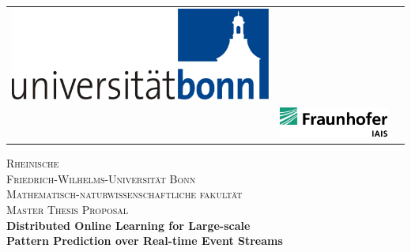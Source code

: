 \begin{titlepage}
		\begin{center}
			\setlength{\tabcolsep}{0pt}
			\begin{tabular}{>{\raggedleft}m{2.5cm}>{\centering}m{\dimexpr\textwidth - 5cm\relax}>{\raggedright}m{2.5cm}}
				\includegraphics[width=\linewidth]{chapters/figures/logo.pdf}%
				&%
				\textbf{\large } \\[5pt]%
				\textbf{\large}%
				&%
				\includegraphics[width=\linewidth]{chapters/figures/iais.pdf} %
			\end{tabular}
			
			
			\textsc{\LARGE Rheinische\\[5mm] Friedrich-Wilhelms-Universität Bonn}\\[1.0cm]
			
			\textsc{\Large Mathematisch-naturwissenschaftliche fakultät}\\[1.0cm]
			
			\textsc{\Large Master Thesis Proposal }\\[1.5cm]
			
			{ \Large \bfseries 
				Distributed Online Learning for Large-scale  \\Pattern Prediction over Real-time Event Streams}\\[2.9cm]
			

\end{center}
\end{titlepage}
